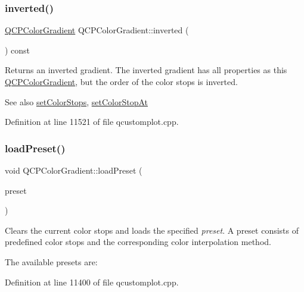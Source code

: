 \subsubsection{\texorpdfstring{inverted()}{inverted()}}
{\footnotesize\ttfamily \hyperlink{class_q_c_p_color_gradient}{Q\+C\+P\+Color\+Gradient} Q\+C\+P\+Color\+Gradient\+::inverted (\begin{DoxyParamCaption}{ }\end{DoxyParamCaption}) const}

Returns an inverted gradient. The inverted gradient has all properties as this \hyperlink{class_q_c_p_color_gradient}{Q\+C\+P\+Color\+Gradient}, but the order of the color stops is inverted.

\begin{DoxySeeAlso}{See also}
\hyperlink{class_q_c_p_color_gradient_a724e828aa6f0ba5011a9392477c35d3a}{set\+Color\+Stops}, \hyperlink{class_q_c_p_color_gradient_a3b48be5e78079db1bb2a1188a4c3390e}{set\+Color\+Stop\+At} 
\end{DoxySeeAlso}


Definition at line 11521 of file qcustomplot.\+cpp.

\mbox{\label{class_q_c_p_color_gradient_aa0aeec1528241728b9671bf8e60b1622}} 
\subsubsection{\texorpdfstring{load\+Preset()}{loadPreset()}}
{\footnotesize\ttfamily void Q\+C\+P\+Color\+Gradient\+::load\+Preset (\begin{DoxyParamCaption}\item[{\hyperlink{class_q_c_p_color_gradient_aed6569828fee337023670272910c9072}{Gradient\+Preset}}]{preset }\end{DoxyParamCaption})}

Clears the current color stops and loads the specified {\itshape preset}. A preset consists of predefined color stops and the corresponding color interpolation method.

The available presets are\+:  

Definition at line 11400 of file qcustomplot.\+cpp.

\mbox{\label{class_q_c_p_color_gradient_aa13fda86406e1d896a465a409ae63b38}} 
